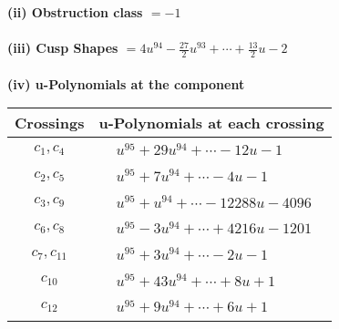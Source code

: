 \documentclass[1p]{elsarticle_modified}
\theoremstyle{definition}
\begin{document}
\flushleft \textbf{(ii) Obstruction class $= -1$}\\~\\
\flushleft \textbf{(iii) Cusp Shapes $= 4 u^{94}-\frac{27}{2} u^{93}+\cdots+\frac{13}{2} u-2$}\\~\\
\newpage\renewcommand{\arraystretch}{1}
\flushleft \textbf{(iv) u-Polynomials at the component}\newline \\
\begin{tabular}{m{50pt}|m{274pt}}
Crossings & \hspace{64pt}u-Polynomials at each crossing \\
\hline $$\begin{aligned}c_{1},c_{4}\end{aligned}$$&$\begin{aligned}
&u^{95}+29 u^{94}+\cdots-12 u-1
\end{aligned}$\\
\hline $$\begin{aligned}c_{2},c_{5}\end{aligned}$$&$\begin{aligned}
&u^{95}+7 u^{94}+\cdots-4 u-1
\end{aligned}$\\
\hline $$\begin{aligned}c_{3},c_{9}\end{aligned}$$&$\begin{aligned}
&u^{95}+u^{94}+\cdots-12288 u-4096
\end{aligned}$\\
\hline $$\begin{aligned}c_{6},c_{8}\end{aligned}$$&$\begin{aligned}
&u^{95}-3 u^{94}+\cdots+4216 u-1201
\end{aligned}$\\
\hline $$\begin{aligned}c_{7},c_{11}\end{aligned}$$&$\begin{aligned}
&u^{95}+3 u^{94}+\cdots-2 u-1
\end{aligned}$\\
\hline $$\begin{aligned}c_{10}\end{aligned}$$&$\begin{aligned}
&u^{95}+43 u^{94}+\cdots+8 u+1
\end{aligned}$\\
\hline $$\begin{aligned}c_{12}\end{aligned}$$&$\begin{aligned}
&u^{95}+9 u^{94}+\cdots+6 u+1
\end{aligned}$\\
\hline
\end{tabular}\\~\\
\end{document}

